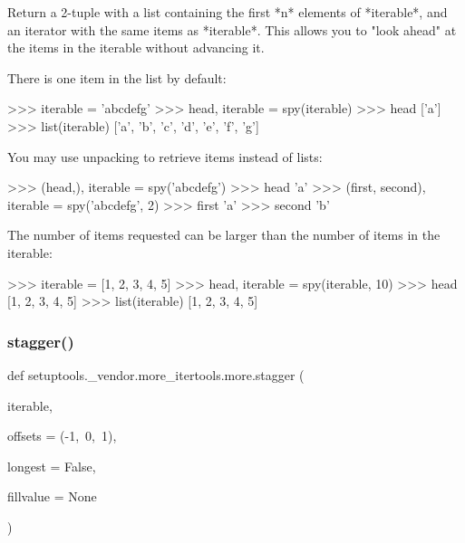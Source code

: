 \begin{DoxyVerb}Return a 2-tuple with a list containing the first *n* elements of
*iterable*, and an iterator with the same items as *iterable*.
This allows you to "look ahead" at the items in the iterable without
advancing it.

There is one item in the list by default:

    >>> iterable = 'abcdefg'
    >>> head, iterable = spy(iterable)
    >>> head
    ['a']
    >>> list(iterable)
    ['a', 'b', 'c', 'd', 'e', 'f', 'g']

You may use unpacking to retrieve items instead of lists:

    >>> (head,), iterable = spy('abcdefg')
    >>> head
    'a'
    >>> (first, second), iterable = spy('abcdefg', 2)
    >>> first
    'a'
    >>> second
    'b'

The number of items requested can be larger than the number of items in
the iterable:

    >>> iterable = [1, 2, 3, 4, 5]
    >>> head, iterable = spy(iterable, 10)
    >>> head
    [1, 2, 3, 4, 5]
    >>> list(iterable)
    [1, 2, 3, 4, 5]\end{DoxyVerb}
 \mbox{\label{namespacesetuptools_1_1__vendor_1_1more__itertools_1_1more_a4e0e2708002360a3ab878c2e2e56e0af}} 
\subsubsection{\texorpdfstring{stagger()}{stagger()}}
{\footnotesize\ttfamily def setuptools.\+\_\+vendor.\+more\+\_\+itertools.\+more.\+stagger (\begin{DoxyParamCaption}\item[{}]{iterable,  }\item[{}]{offsets = {\ttfamily (-\/1,~0,~1)},  }\item[{}]{longest = {\ttfamily False},  }\item[{}]{fillvalue = {\ttfamily None} }\end{DoxyParamCaption})}


